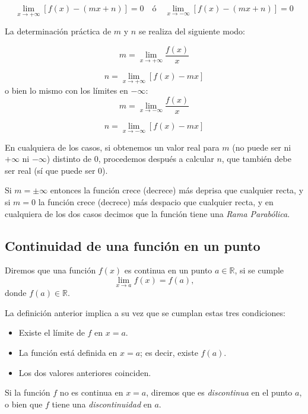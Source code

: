 \[
\mathop {\lim }\limits_{x \to  + \infty } \left[ {f(x) - \left( {mx
+ n} \right)} \right] = 0\quad\text{ó}\quad\mathop {\lim }\limits_{x
\to - \infty } \left[ {f(x) - \left( {mx + n} \right)} \right] = 0
\]


La determinación práctica de $m$ y $n$ se realiza del siguiente
modo:

\[
m = \mathop {\lim }\limits_{x \to  + \infty } \frac{{f(x)}} {x}
\]

\[
n = \mathop {\lim }\limits_{x \to  + \infty } \left[ {f(x) - mx}
\right]
\]
o bien lo mismo con los límites en $-\infty$:
\[
m = \mathop {\lim }\limits_{x \to  - \infty } \frac{{f(x)}} {x}
\]

\[
n = \mathop {\lim }\limits_{x \to  - \infty } \left[ {f(x) - mx}
\right]
\]

En cualquiera de los casos, si obtenemos un valor real para $m$ (no
puede ser ni $+\infty$ ni $-\infty$) distinto de $0$, procedemos
después a calcular $n$, que también debe ser real (sí que puede ser
$0$).

Si $m=\pm\infty$ entonces la función crece (decrece) más deprisa que
cualquier recta, y si $m=0$ la función crece (decrece) más despacio
que cualquier recta, y en cualquiera de los dos casos decimos que la
función tiene una \emph{Rama Parabólica}.

\subsection{Continuidad de una función en un punto}
Diremos que una función $f(x)$ es continua en un punto $a\in
\mathbb{R}$, si se cumple
\[ \lim_{x\rightarrow a}f(x)=f(a),\]
donde $f(a)\in \mathbb{R}$.

La definición anterior implica a su vez que se cumplan estas tres
condiciones:

\begin{itemize}

\item Existe el límite de $f$ en $x=a$.

\item La función está definida en $x=a$; es decir, existe $f(a)$.

\item Los dos valores anteriores coinciden.

\end{itemize}

Si la función $f$ no es continua en $x=a$, diremos que es
\emph{discontinua} en el punto $a$, o bien que $f$ tiene una
\emph{discontinuidad} en $a$.

